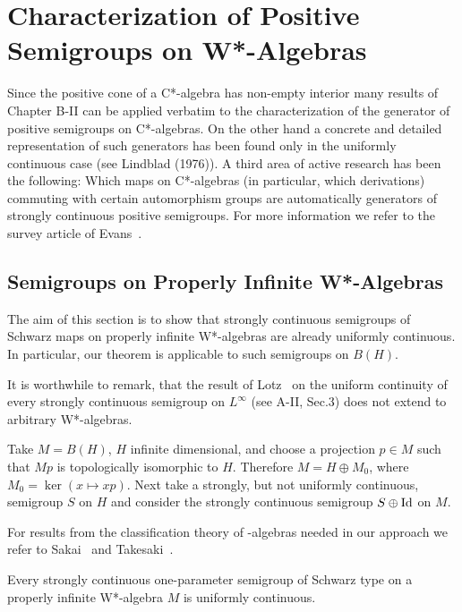 
\chapter{Characterization of Positive Semigroups on W*-Algebras}

Since the positive cone of a C*-algebra has non-empty interior many results of Chapter B-II can be applied verbatim to the characterization of the generator of positive semigroups on C*-algebras.
On the other hand a concrete and detailed representation of such generators has been found only in the uniformly continuous case (see Lindblad (1976)).
A third area of active research has been the following: Which maps on C*-algebras (in particular, which derivations) commuting with certain automorphism groups are automatically generators of strongly continuous positive semigroups.
For more information we refer to the survey article of Evans~\cite{evans:1984}.

\section{Semigroups on Properly Infinite W*-Algebras}

The aim of this section is to show that strongly continuous semigroups of Schwarz maps on properly infinite W*-algebras are already uniformly continuous.
In particular, our theorem is applicable to such semigroups on $B(H)$.

It is worthwhile to remark, that the result of Lotz~\cite{lotz:1985} on the uniform continuity of every strongly continuous semigroup on $L^\infty$ (see A-II, Sec.3) does not extend to arbitrary W*-algebras.
\begin{example}
Take $M = B(H)$, $H$ infinite dimensional, and choose a projection $p \in M$ such that $Mp$ is topologically isomorphic to $H$.
Therefore $M = H \oplus M_{0}$, where $M_{0} = \ker(x \mapsto xp)$.
Next take a strongly, but not uniformly continuous, semigroup $S$ on $H$ and consider the strongly continuous semigroup $S \oplus \operatorname{Id}$ on $M$.
\end{example}
For results from the classification theory of \WA-algebras needed in our approach we refer to Sakai~\cite[2.2]{sakai:1971} and Takesaki~\cite[V.1]{takesaki:1979}.

\begin{theorem}\label{thm:schwarz_uniform}
Every strongly continuous one-parameter semigroup of Schwarz type on a properly infinite W*-algebra $M$ is uniformly continuous.
\end{theorem}

